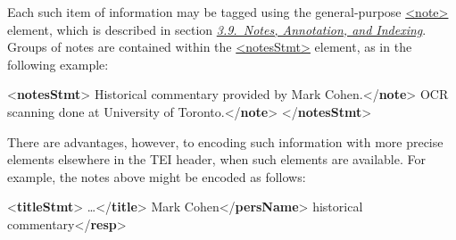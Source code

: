 Each such item of information may be tagged using the general-purpose \hyperref[TEI.note]{<note>} element, which is described in section \textit{\hyperref[CONO]{3.9.\ Notes, Annotation, and Indexing}}. Groups of notes are contained within the \hyperref[TEI.notesStmt]{<notesStmt>} element, as in the following example: \par\bgroup{}\exampleFont \begin{shaded}\noindent\mbox{}{<\textbf{notesStmt}>}\mbox{}\newline 
{}Historical commentary provided by Mark Cohen.{</\textbf{note}>}\mbox{}\newline 
{}OCR scanning done at University of Toronto.{</\textbf{note}>}\mbox{}\newline 
{</\textbf{notesStmt}>}\end{shaded}\egroup\par \noindent  There are advantages, however, to encoding such information with more precise elements elsewhere in the TEI header, when such elements are available. For example, the notes above might be encoded as follows: \par\bgroup{}\exampleFont \begin{shaded}\noindent\mbox{}{<\textbf{titleStmt}>}\mbox{}\newline 
{}…{</\textbf{title}>}\mbox{}\newline 
{}\mbox{}\newline 
\hspace*{1em}Mark Cohen{</\textbf{persName}>}\mbox{}\newline 
\hspace*{1em}historical commentary{</\textbf{resp}>}\mbox{}\newline 
{}\mbox{}\newline 

\end{shaded}
